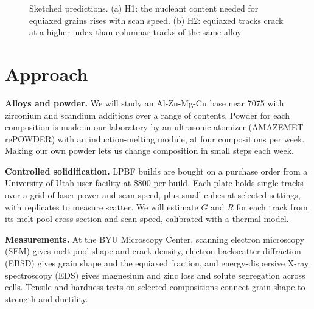 \documentclass[11pt,letterpaper]{article}
\begin{document}
\begin{figure}[t]
\centering
{}
\caption{Sketched predictions. (a) H1: the nucleant content needed for
equiaxed grains rises with scan speed. (b) H2:
equiaxed tracks crack at a higher index than columnar tracks of the same
alloy.}
\label{fig:predictions}
\end{figure}

\section{Approach}

\textbf{Alloys and powder.} We will study an Al-Zn-Mg-Cu base near 7075 with
zirconium and scandium additions over a range of contents. Powder for each
composition is made in our laboratory by an ultrasonic atomizer (AMAZEMET
rePOWDER) with an induction-melting module, at four compositions per week.
Making our own powder lets us change composition in small steps each
week.

\textbf{Controlled solidification.} LPBF builds are bought on a purchase
order from a University of Utah user facility at \$800 per build. Each plate
holds single tracks over a grid of laser power and scan speed, plus small
cubes at selected settings, with replicates to measure scatter. We will
estimate $G$ and $R$ for each track from its melt-pool cross-section and scan
speed, calibrated with a thermal model.

\textbf{Measurements.} At the BYU Microscopy Center, scanning electron
microscopy (SEM) gives melt-pool shape and crack density, electron
backscatter diffraction (EBSD) gives grain shape and the equiaxed fraction,
and energy-dispersive X-ray spectroscopy (EDS) gives magnesium and zinc loss
and solute segregation across cells. Tensile and hardness tests on selected
compositions connect grain shape to strength and ductility.
\end{document}
